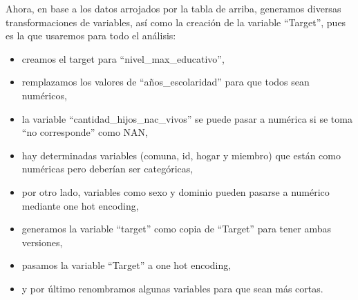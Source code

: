 \documentclass[a4paper]{article}
\begin{document}
    Ahora, en base a los datos arrojados por la tabla de arriba, generamos diversas transformaciones de variables, así como la creación de la variable ``Target'', pues es la que usaremos para todo el análisis:
    \begin{itemize}
        \item creamos el target para ``nivel\_max\_educativo'',
        \item remplazamos los valores de ``años\_escolaridad'' para que todos sean numéricos,
        \item la variable ``cantidad\_hijos\_nac\_vivos'' se puede pasar a numérica si se toma ``no corresponde'' como NAN,
        \item hay determinadas variables (comuna, id, hogar y miembro) que están como numéricas pero deberían ser categóricas,
        \item por otro lado, variables como sexo y dominio pueden pasarse a numérico mediante one hot encoding,
        \item generamos la variable ``target'' como copia de ``Target'' para tener ambas versiones,
        \item pasamos la variable ``Target'' a one hot encoding,
        \item y por último renombramos algunas variables para que sean más cortas.
    \end{itemize}
\end{document}
